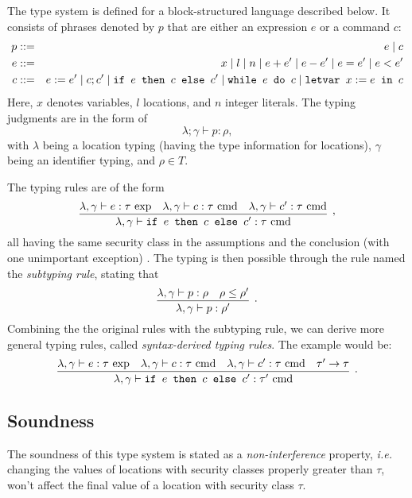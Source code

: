 \documentclass{llncs}
\newcommand{\lit}[1]{\mathrm{#1}}
\begin{document}
The type system is defined for a block-structured language described below. It consists of phrases denoted by $p$ that are either an expression $e$ or a command $c$:
\begin{eqnarray}
p &::=& e \mid c \nonumber \\
e &::=& x \mid l \mid n \mid e + e' \mid e - e' \mid e = e' \mid e < e' \nonumber \\
c &::=& e := e' \mid c; c' \mid \mbox{\texttt{if }} e \mbox{\texttt{ then }} c \mbox{\texttt{ else }} c' \mid \mbox{\texttt{while }} e \mbox{\texttt{ do }} c \mid \mbox{\texttt{letvar }} x := e \mbox{\texttt{ in }} c \nonumber
\end{eqnarray}
Here, $x$ denotes variables, $l$ locations, and $n$ integer literals.
The typing judgments are in the form of
\[
\lambda; \gamma \vdash p : \rho,
\]
with $\lambda$ being a location typing (having the type information for locations), $\gamma$ being an identifier typing, and $\rho \in T$.

The typing rules are of the form
\[
\infer[,]{\lambda, \gamma \vdash \mbox{\texttt{if }} e \mbox{\texttt{ then }} c \mbox{\texttt{ else }} c' : \tau\ \lit{cmd}}{
    \lambda, \gamma \vdash e : \tau\ \lit{exp}
    &
    \lambda, \gamma \vdash c : \tau\ \lit{cmd}
    &
    \lambda, \gamma \vdash c' : \tau\ \lit{cmd}
}
\]
all having the same security class in the assumptions and the conclusion (with one unimportant exception) \cite{VolpanoIS96}. The typing is then possible through the rule named the \textit{subtyping rule}, stating that
\[
\infer[.]{\lambda, \gamma \vdash p : \rho'}{
    \lambda, \gamma \vdash p : \rho
    &
    \rho \leq \rho'
}
\]
Combining the the original rules with the subtyping rule, we can derive more general typing rules, called \textit{syntax-derived typing rules}. The example would be:
\[
\infer[.]{\lambda, \gamma \vdash \mbox{\texttt{if }} e \mbox{\texttt{ then }} c \mbox{\texttt{ else }} c' : \tau'\ \lit{cmd}}{
    \lambda, \gamma \vdash e : \tau\ \lit{exp}
    &
    \lambda, \gamma \vdash c : \tau\ \lit{cmd}
    &
    \lambda, \gamma \vdash c' : \tau\ \lit{cmd}
    &
    \tau' \rightarrow \tau
}
\]

\subsection{Soundness}

The soundness of this type system is stated as a \textit{non-interference} property, \textit{i.e.} changing the values of locations with security classes properly greater than $\tau$, won't affect the final value of a location with security class $\tau$.
\end{document}
